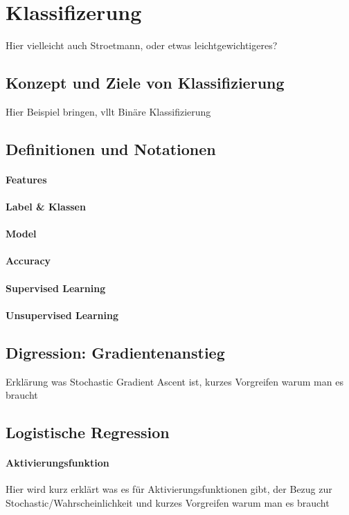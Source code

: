 \section{Klassifizerung}
\label{sec:Klassifizierung}
Hier vielleicht auch Stroetmann, oder etwas leichtgewichtigeres?
\subsection{Konzept und Ziele von Klassifizierung}
Hier Beispiel bringen, vllt Binäre Klassifizierung

\subsection{Definitionen und Notationen}
\paragraph{Features}
\paragraph{Label \& Klassen}
\paragraph{Model}
\paragraph{Accuracy}

\paragraph{Supervised Learning}
\paragraph{Unsupervised Learning}

\subsection{Digression: Gradientenanstieg}
Erklärung was Stochastic Gradient Ascent ist, kurzes Vorgreifen warum man es braucht
\subsection{Logistische Regression}

\paragraph{Aktivierungsfunktion}
Hier wird kurz erklärt was es für Aktivierungsfunktionen gibt, der Bezug zur Stochastic/Wahrscheinlichkeit und kurzes Vorgreifen warum man es braucht
